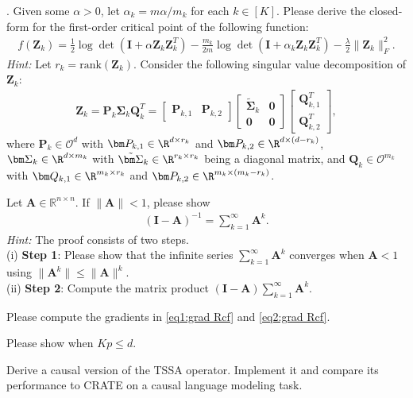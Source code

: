\documentclass[../../book-main.tex]{subfiles}
\begin{document}
\begin{exercise}
. Given some $\alpha >0$, let $\alpha_k=m\alpha/m_k$ for each $k \in [K]$. Please derive the closed-form for the first-order critical point of the following function: 
\begin{align*}
    f(\bm Z_k) = \frac{1}{2}\log\det\left(\bm I + \alpha\bm Z_k\bm Z_k^T \right) - \frac{m_k}{2m}\log\det\left(\bm I + \alpha_k \bm Z_k\bm Z_k^T \right) - \frac{\lambda}{2}\|\bm Z_k\|_F^2. 
\end{align*}
{\em Hint:} Let $r_k=\mathrm{rank}(\bm Z_k)$. Consider the following singular value decomposition of $\bm Z_k$: 
\begin{align*}
    \bm Z_k = \bm P_k\bm \Sigma_k\bm Q_k^T = \begin{bmatrix}
        \bm P_{k,1} & \bm P_{k,2}
    \end{bmatrix} \begin{bmatrix}
        \tilde{\bm \Sigma}_{k} & \bm 0 \\
        \bm 0 & \bm 0
    \end{bmatrix} 
    \begin{bmatrix}
        \bm Q_{k,1}^T \\ \bm Q_{k,2}^T
    \end{bmatrix}, 
\end{align*}
where $\bm P_k \in \mathcal{O}^d$ with $\bm P_{k,1} \in \R^{d\times r_k}$ and  $\bm P_{k,2} \in \R^{d\times (d-r_k)}$, $\bm \Sigma_k \in \R^{d\times m_k}$ with $\tilde{\bm \Sigma}_{k} \in \R^{r_k\times r_k}$ being a diagonal matrix, and  $\bm Q_k \in \mathcal{O}^{m_k}$ with $\bm Q_{k,1} \in \R^{m_k\times r_k}$ and  $\bm P_{k,2} \in \R^{m_k \times (m_k-r_k)}$. 
\medskip 

\end{exercise}


\begin{exercise}\label{ex:neumannn} 
Let $\bm A \in \mathbb{R}^{n\times n}$. If $\|\bm A\| < 1$, please show 
\begin{align}\label{eq:neumann}
    \left( \bm I - \bm A\right)^{-1} = \sum_{k=1}^\infty \bm A^k.  
\end{align}
{\em Hint:} The proof consists of two steps. \\
(i) {\bf Step 1}: Please show that the infinite series $\sum_{k=1}^\infty \bm A^k$ converges when $\bm A < 1$ using $\|\bm A^k\| \le \|\bm A\|^k$. \\
(ii) {\bf Step 2}: Compute the matrix product $(\bm I - \bm A) \sum_{k=1}^\infty \bm A^k$. 
\end{exercise}


\begin{exercise}
    Please compute the gradients in \eqref{eq1:grad Rcf} and \eqref{eq2:grad Rcf}. 
\end{exercise}


\begin{exercise}
    Please show  when $Kp \le d$. 
\end{exercise}

\begin{exercise}
    Derive a causal version of the TSSA operator. Implement it and compare its performance to CRATE on a causal language modeling task.
\end{exercise}
\end{document}
